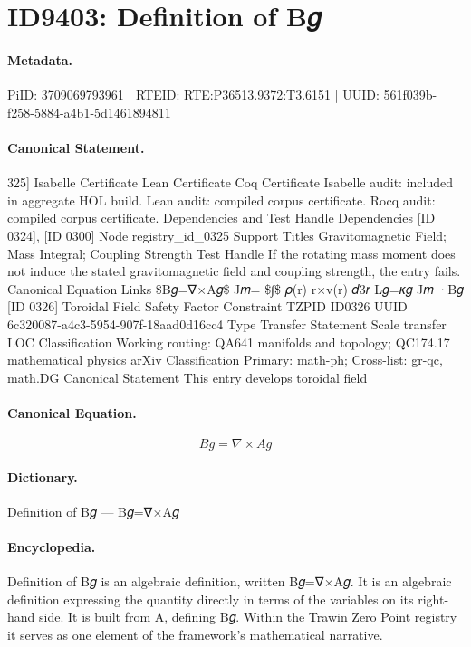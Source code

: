 \section*{ID9403: Definition of B𝑔}
\paragraph{Metadata.}
PiID: 3709069793961 | RTEID: RTE:P36513.9372:T3.6151 | UUID: 561f039b-f258-5884-a4b1-5d1461894811

\paragraph{Canonical Statement.}
325] Isabelle Certificate Lean Certificate Coq Certificate Isabelle audit: included in aggregate HOL build. Lean audit: compiled corpus certificate. Rocq audit: compiled corpus certificate. Dependencies and Test Handle Dependencies [ID 0324], [ID 0300] Node registry\_id\_0325 Support Titles Gravitomagnetic Field; Mass Integral; Coupling Strength Test Handle If the rotating mass moment does not induce the stated gravitomagnetic field and coupling strength, the entry fails. Canonical Equation Links \$B𝑔=∇×A𝑔\$ J𝑚= \$∫\$ 𝜌(r) r×v(r) 𝑑3𝑟 L𝑔=𝜅𝑔 J𝑚 ·B𝑔 [ID 0326] Toroidal Field Safety Factor Constraint TZPID ID0326 UUID 6c320087-a4c3-5954-907f-18aad0d16cc4 Type Transfer Statement Scale transfer LOC Classification Working routing: QA641 manifolds and topology; QC174.17 mathematical physics arXiv Classification Primary: math-ph; Cross-list: gr-qc, math.DG Canonical Statement This entry develops toroidal field

\paragraph{Canonical Equation.}
\[
B𝑔=∇×A𝑔
\]

\paragraph{Dictionary.}
Definition of B𝑔 — B𝑔=∇×A𝑔

\paragraph{Encyclopedia.}
Definition of B𝑔 is an algebraic definition, written B𝑔=∇×A𝑔. It is an algebraic definition expressing the quantity directly in terms of the variables on its right-hand side. It is built from A, defining B𝑔. Within the Trawin Zero Point registry it serves as one element of the framework's mathematical narrative.
